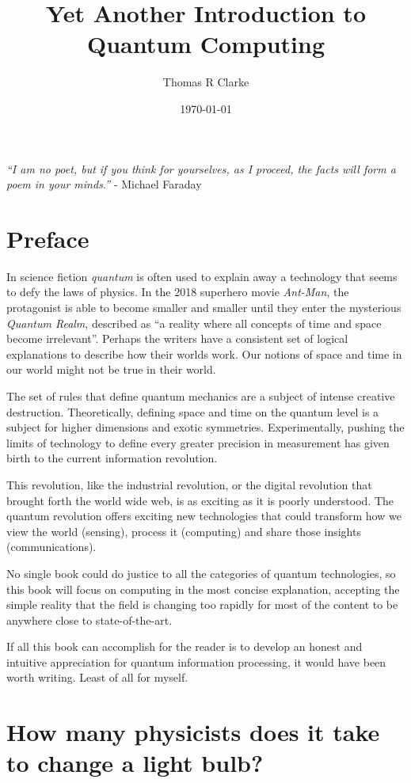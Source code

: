 \documentclass{book}
\title{Yet Another Introduction to Quantum Computing}
\author{Thomas R Clarke}
\date{\today}
\begin{document}
\maketitle
\tableofcontents

\textit{“I am no poet, but if you think for yourselves, as I proceed, the facts will form a poem in your minds.”} - Michael Faraday

\chapter*{Preface}

In science fiction \textit{quantum} is often used to explain away a technology that seems to defy the laws of physics. In the 2018 superhero movie \textit{Ant-Man}, the protagonist is able to become smaller and smaller until they enter the mysterious \textit{Quantum Realm}, described as “a reality where all concepts of time and space become irrelevant”. Perhaps the writers have a consistent set of logical explanations to describe how their worlds work. Our notions of space and time in our world might not be true in their world. 

The set of rules that define quantum mechanics are a subject of intense creative destruction. Theoretically, defining space and time on the quantum level is a subject for higher dimensions and exotic symmetries. Experimentally, pushing the limits of technology to define every greater precision in measurement has given birth to the current information revolution. 

This revolution, like the industrial revolution, or the digital revolution that brought forth the world wide web, is as exciting as it is poorly understood. The quantum revolution offers exciting new technologies that could transform how we view the world (sensing), process it (computing) and share those insights (communications). 

No single book could do justice to all the categories of quantum technologies, so this book will focus on computing in the most concise explanation, accepting the simple reality that the field is changing too rapidly for most of the content to be anywhere close to state-of-the-art. 

If all this book can accomplish for the reader is to develop an honest and intuitive appreciation for quantum information processing, it would have been worth writing. Least of all for myself. 


\chapter{How many physicists does it take to change a light bulb?}
\end{document}
